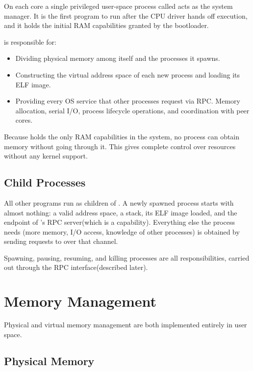 On each core a single privileged user-space process called  acts
as the system manager.  It is the first program to run after the CPU driver
hands off execution, and it holds the initial RAM capabilities granted by 
the bootloader.

\medskip\noindent
{} is responsible for:

\begin{itemize}[nosep]
  \item Dividing physical memory among itself and the processes it spawns.
  \item Constructing the virtual address space of each new process and loading
        its ELF image.
  \item Providing every OS service that other processes request via RPC.
        Memory allocation, serial I/O, process lifecycle operations, and
        coordination with peer cores.
\end{itemize}

\medskip\noindent
Because  holds the only RAM capabilities in the system, no process
can obtain memory without going through it. This gives  complete
control over resources without any kernel support.

\subsection{Child Processes}

All other programs run as children of .  A newly spawned process
starts with almost nothing: a valid address space, a stack, its ELF image
loaded, and the endpoint of 's RPC server(which is a capability).
Everything else the process needs (more memory, I/O access, knowledge of other
processes) is obtained by sending requests to  over that channel.

\medskip\noindent
Spawning, pausing, resuming, and killing processes are all 
responsibilities, carried out through the RPC interface(described later).  

\section{Memory Management}


Physical and virtual memory management are both implemented entirely in user
space.

\subsection{Physical Memory}

